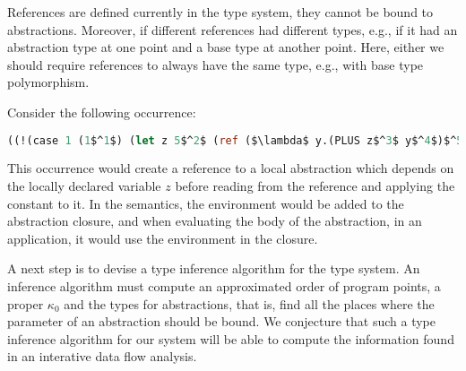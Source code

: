 \documentclass{llncs}
\begin{document}
References are defined currently in the type system, they cannot be bound to abstractions.
Moreover, if different references had different types, e.g., if it had
an abstraction type at one point and a base type at another point. 
Here, either we should require references to always have the same
type, e.g., with base type polymorphism.

Consider the following occurrence:
\begin{lstlisting}[language=Caml, mathescape=true]
((!(case 1 (1$^1$) (let z 5$^2$ (ref ($\lambda$ y.(PLUS z$^3$ y$^4$)$^5$)$^6$))$^7$)$^8$)$^9$ 5)$^{10}$
\end{lstlisting}
This occurrence would create a reference to a local abstraction which depends on the locally declared variable $z$ before reading from the reference and applying the constant to it.
In the semantics, the environment would be added to the abstraction closure, and when evaluating the body of the abstraction, in an application, it would use the environment in the closure.

A next step is to devise a type inference algorithm for the type
system. An inference algorithm must compute an approximated order of
program points, a proper $\kappa_0$ and the types for abstractions,
that is, find all the places where the parameter of an abstraction
should be bound.  We conjecture that such a type inference algorithm
for our system will be able to compute the information found in an
interative data flow analysis.



\end{document}
